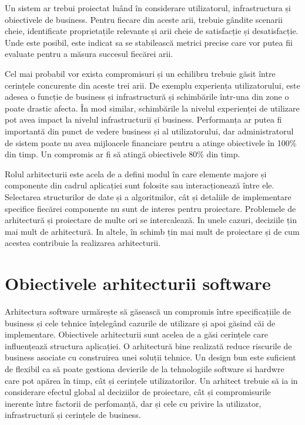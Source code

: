 \documentclass[12pt, a4paper, oneside, romanian]{teza-upb}
\begin{document}
Un sistem ar trebui proiectat luând în considerare utilizatorul, infrastructura și obiectivele de business. Pentru fiecare din aceste arii, trebuie gândite scenarii cheie, identificate proprietațile relevante și arii cheie de satisfacție și desatisfacție. Unde este posibil, este indicat sa se stabilească metrici precise care vor putea fii evaluate pentru a măsura succesul fiecărei arii.

Cel mai probabil vor exista compromisuri și un echilibru trebuie găsit între cerințele concurente din aceste trei arii. De exemplu experiența utilizatorului, este adesea o funcție de business și infrastructură și schimbările într-una din zone o poate drastic afecta. În mod similar, schimbările la nivelul experienței de utilizare pot avea impact la nivelul infrastructurii și business. Performanța ar putea fi importantă din punct de vedere business și al utilizatorului, dar administratorul de sistem poate nu avea mijloacele financiare pentru a atinge obiectivele în 100\% din timp. Un compromis ar fi să atingă obiectivele 80\% din timp.

Rolul arhitecturii este acela de a defini modul în care elemente majore și componente din cadrul aplicației sunt folosite sau interacționează între ele. Selectarea structurilor de date și a algoritmilor, cât și detaliile de implementare specifice fiecărei componente nu sunt de interes pentru proiectare. Problemele de arhitectură și proiectare de multe ori se intercalează. In unele cazuri, deciziile țin mai mult de arhitectură. In altele, în schimb țin mai mult de proiectare și de cum acestea contribuie la realizarea arhitecturii.

\section{Obiectivele arhitecturii software}

Arhitectura software urmărește să găsească un compromis între specificațiile de business și cele tehnice înțelegând cazurile de utilizare și apoi găsind căi de implementare. Obiectivele arhitecturii sunt acelea de a găsi cerințele care influențează structura aplicației. O arhitectură bine realizată reduce riscurile de business asociate cu construirea unei soluții tehnice. Un design bun este suficient de flexibil ca să poate gestiona devierile de la tehnologiile software si hardwre care pot apărea în timp, cât și cerințele utilizatorilor. Un arhitect trebuie să ia in considerare efectul global al deciziilor de proiectare, cât și compromisurile inerente între factorii de perfomanță, dar și cele cu privire la utilizator, infrastructură și cerințele de business.
\end{document}
